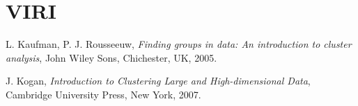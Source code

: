 \documentclass[11pt, a4paper]{article}
\begin{document}
\newpage

\section{VIRI}
\noindent L. Kaufman, P. J. Rousseeuw, \textsl{Finding groups in data: An introduction to cluster analysis}, John
Wiley Sons, Chichester, UK, 2005. 

\vspace{0.5cm}

\noindent  J. Kogan, \textsl{Introduction to Clustering Large and High-dimensional Data}, Cambridge University
Press, New York, 2007.
\end{document}
